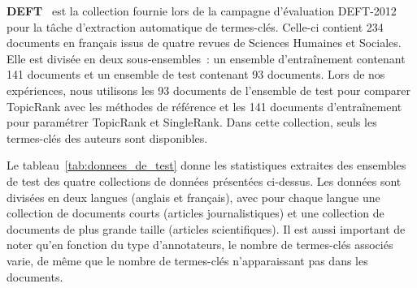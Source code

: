       \textbf{DEFT}~\cite{paroubek2012deft} est la collection fournie lors de la
      campagne d'évaluation DEFT-2012 pour la tâche d'extraction automatique de
      termes-clés. Celle-ci contient 234 documents en français issus de quatre
      revues de Sciences Humaines et Sociales. Elle est divisée en deux
      sous-ensembles~: un ensemble d'entraînement contenant 141 documents et un
      ensemble de test contenant 93 documents. Lors de nos expériences, nous
      utilisons les 93 documents de l'ensemble de test pour comparer TopicRank
      avec les méthodes de référence et les 141 documents d'entraînement pour
      paramétrer TopicRank et SingleRank. Dans cette collection, seuls les
      termes-clés des auteurs sont disponibles.

      Le tableau~\ref{tab:donnees_de_test} donne les statistiques extraites des
      ensembles de test des quatre collections de données présentées ci-dessus.
      Les données sont divisées en deux langues (anglais et français), avec pour
      chaque langue une collection de documents courts (articles
      journalistiques) et une collection de documents de plus grande taille
      (articles scientifiques). Il est aussi important de noter qu'en fonction
      du type d'annotateurs, le nombre de termes-clés associés varie, de même
      que le nombre de termes-clés n'apparaissant pas dans les documents.

